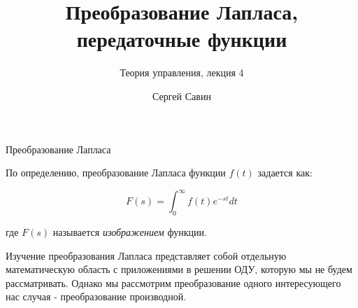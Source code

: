 \documentclass{beamer}
\title{Преобразование Лапласа, передаточные функции}
\subtitle{Теория управления, лекция 4}
\author{Сергей Савин}
\date{\mydate}
\begin{document}
\maketitle


%
%



\begin{frame}{Преобразование Лапласа}
	\begin{flushleft}
		
		По определению, преобразование Лапласа функции $f(t)$ задается как:
		
		\begin{equation}
			F(s) = \int_0^\infty f(t) e^{-st}dt
		\end{equation}
		
		где $F(s)$ называется \emph{изображением} функции.
		
		\bigskip
		
		Изучение преобразования Лапласа представляет собой отдельную математическую область с приложениями в решении ОДУ, которую мы не будем рассматривать. Однако мы рассмотрим преобразование одного интересующего нас случая - преобразование производной.
		
	\end{flushleft}
\end{frame}
\end{document}
